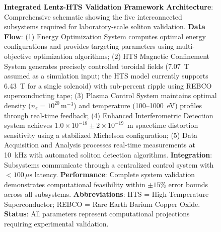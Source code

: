 \documentclass[12pt,a4paper]{article}
\begin{document}
\begin{figure}[htbp]
\centering
{}
\caption{\textbf{Integrated Lentz-HTS Validation Framework Architecture}: Comprehensive schematic showing the five interconnected subsystems required for laboratory-scale soliton validation. \textbf{Data Flow}: (1) Energy Optimization System computes optimal energy configurations and provides targeting parameters using multi-objective optimization algorithms; (2) HTS Magnetic Confinement System generates precisely controlled toroidal fields (7.07~T assumed as a simulation input; the HTS model currently supports 6.43~T for a single solenoid) with sub-percent ripple using REBCO superconducting tape; (3) Plasma Control System maintains optimal density ($n_e = 10^{20}\,\mathrm{m}^{-3}$) and temperature (100--1000~eV) profiles through real-time feedback; (4) Enhanced Interferometric Detection system achieves $1.0\times10^{-18}\pm2\times10^{-19}$~m spacetime distortion sensitivity using a stabilized Michelson configuration; (5) Data Acquisition and Analysis processes real-time measurements at 10~kHz with automated soliton detection algorithms. \textbf{Integration}: Subsystems communicate through a centralized control system with $<100\,\mu\mathrm{s}$ latency. \textbf{Performance}: Complete system validation demonstrates computational feasibility within $\pm15\%$ error bounds across all subsystems. \textbf{Abbreviations}: HTS = High-Temperature Superconductor; REBCO = Rare Earth Barium Copper Oxide. \textbf{Status}: All parameters represent computational projections requiring experimental validation.}
\label{fig:framework}
\end{figure}
\end{document}
